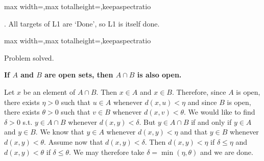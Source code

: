 \documentclass[a4paper,twoside,12pt]{article} %
\makeatletter
\DeclareRobustCommand{\_}{%
  \leavevmode\vbox{%
    \hrule\@width.4em
          \@height-.16ex
          \@depth\dimexpr.16ex+.28pt\relax}}
\newenvironment{fit}{\begin{adjustbox}{max width=\textwidth,max totalheight=\textheight,keepaspectratio}}{\end{adjustbox}}
\makeatother
\begin{document}
\begin{steps}
\begin{fit}
%
\end{fit}
\smallskip

. All targets of L1 are `Done', so L1 is itself done.\nopagebreak[4] 
\marginpar{}\nopagebreak[4] 
\smallskip\nopagebreak[4] 

\begin{fit}%
\end{fit}

Problem solved.
\cleardoublepage

\end{steps}
{\begin{center} \large \textbf{If $A$ and $B$ are open sets, then $A \cap B$ is also open.}\end{center}}\nopagebreak[4]

\begin{center}
\begin{minipage}{120mm}
Let $x$ be an element of $A\cap B$. Then $x\in A$ and $x\in B$. Therefore, since $A$ is open, there exists $\eta > 0$ such that $u\in A$\textrm{ whenever }$\textit{d}(x,u) < \eta$ and since $B$ is open, there exists $\theta > 0$ such that $v\in B$\textrm{ whenever }$\textit{d}(x,v) < \theta$. We would like to find $\delta > 0$ s.t. $y\in A\cap B$\textrm{ whenever }$\textit{d}(x,y) < \delta$. But $y\in A\cap B$ if and only if $y\in A$ and $y\in B$. We know that $y\in A$ whenever $\textit{d}(x,y) < \eta$ and that $y\in B$ whenever $\textit{d}(x,y) < \theta$. Assume now that $\textit{d}(x,y) < \delta$. Then $\textit{d}(x,y) < \eta$ if $\delta\leqslant \eta$ and $\textit{d}(x,y) < \theta$ if $\delta\leqslant \theta$. We may therefore take $\delta = \min(\eta,\theta)$ and we are done.
\end{minipage}
\end{center}
\end{document}
